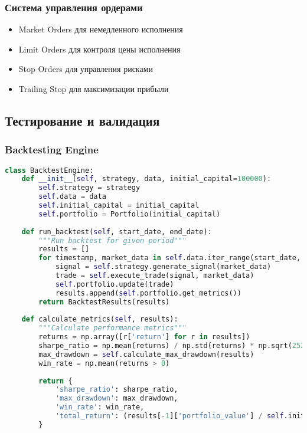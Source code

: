 \documentclass[12pt,a4paper]{article}
\begin{document}
\subsubsection{Система управления ордерами}
\begin{itemize}
    \item Market Orders для немедленного исполнения
    \item Limit Orders для контроля цены исполнения
    \item Stop Orders для управления рисками
    \item Trailing Stop для максимизации прибыли
\end{itemize}

\subsection{Тестирование и валидация}

\subsubsection{Backtesting Engine}


\begin{lstlisting}[language=Python, caption=Backtesting Framework]
class BacktestEngine:
    def __init__(self, strategy, data, initial_capital=100000):
        self.strategy = strategy
        self.data = data
        self.initial_capital = initial_capital
        self.portfolio = Portfolio(initial_capital)
    
    def run_backtest(self, start_date, end_date):
        """Run backtest for given period"""
        results = []
        for timestamp, market_data in self.data.iter_range(start_date, end_date):
            signal = self.strategy.generate_signal(market_data)
            trade = self.execute_trade(signal, market_data)
            self.portfolio.update(trade)
            results.append(self.portfolio.get_metrics())
        return BacktestResults(results)
    
    def calculate_metrics(self, results):
        """Calculate performance metrics"""
        returns = np.array([r['return'] for r in results])
        sharpe_ratio = np.mean(returns) / np.std(returns) * np.sqrt(252)
        max_drawdown = self.calculate_max_drawdown(results)
        win_rate = np.mean(returns > 0)
        
        return {
            'sharpe_ratio': sharpe_ratio,
            'max_drawdown': max_drawdown,
            'win_rate': win_rate,
            'total_return': (results[-1]['portfolio_value'] / self.initial_capital - 1) * 100
        }
\end{lstlisting}
\end{document}
